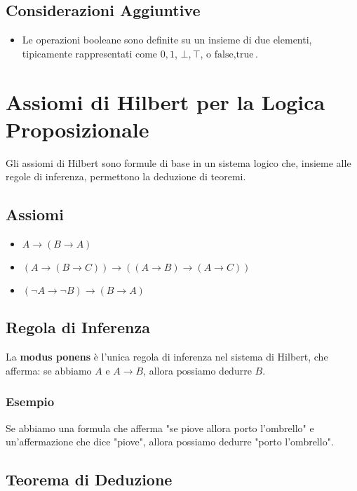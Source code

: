 \documentclass{article}
\begin{document}
\subsection{Considerazioni Aggiuntive}
\begin{itemize}
    \item Le operazioni booleane sono definite su un insieme di due elementi, tipicamente rappresentati come ${0, 1}$, ${\bot, \top}$, o ${\text{false}, \text{true}}$.
\end{itemize}
\newpage
\section{Assiomi di Hilbert per la Logica Proposizionale}

Gli assiomi di Hilbert sono formule di base in un sistema logico che, insieme alle regole di inferenza, permettono la deduzione di teoremi.

\subsection{Assiomi}
\begin{itemize}
    \item $A \rightarrow (B \rightarrow A)$
    \item $(A \rightarrow (B \rightarrow C)) \rightarrow ((A \rightarrow B) \rightarrow (A \rightarrow C))$
    \item $(\neg A \rightarrow \neg B) \rightarrow (B \rightarrow A)$
\end{itemize}

\subsection{Regola di Inferenza}
La \textbf{modus ponens} è l'unica regola di inferenza nel sistema di Hilbert, che afferma: se abbiamo $A$ e $A \rightarrow B$, allora possiamo dedurre $B$.

\subsubsection{Esempio}
Se abbiamo una formula che afferma "se piove allora porto l'ombrello" e un'affermazione che dice "piove", allora possiamo dedurre "porto l'ombrello".

\subsection{Teorema di Deduzione}
\end{document}
